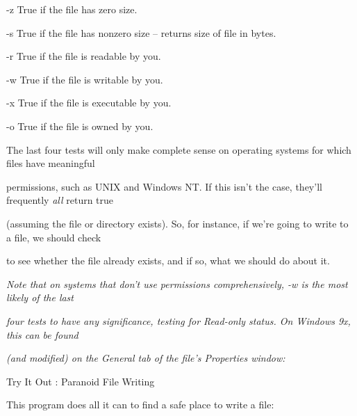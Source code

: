 \documentclass[a4paper,11pt]{book}
\begin{document}
\noindent 

\noindent -z True if the file has zero size.

\noindent 

\noindent -s True if the file has nonzero size -- returns size of file in bytes.

\noindent 

\noindent -r True if the file is readable by you.

\noindent 

\noindent -w True if the file is writable by you.

\noindent 

\noindent -x True if the file is executable by you.

\noindent 

\noindent -o True if the file is owned by you.

\noindent 

\noindent 

\noindent The last four tests will only make complete sense on operating systems for which files have meaningful

\noindent permissions, such as UNIX and Windows NT. If this isn't the case, they'll frequently \textit{all }return true

\noindent (assuming the file or directory exists). So, for instance, if we're going to write to a file, we should check

\noindent to see whether the file already exists, and if so, what we should do about it.

\noindent 

\noindent 

\noindent \textit{Note that on systems that don't use permissions comprehensively, -w is the most likely of the last}

\noindent \textit{four tests to have any significance, testing for Read-only status. On Windows 9x, this can be found}

\noindent \textit{(and modified) on the General tab of the file's Properties window:}

\noindent 

\noindent 

\noindent Try It Out : Paranoid File Writing

\noindent 

\noindent 

\noindent This program does all it can to find a safe place to write a file:

\noindent 
\end{document}
